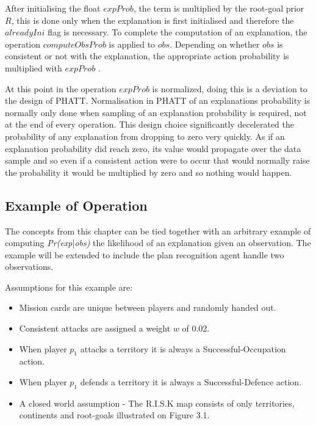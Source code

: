 \documentclass[parskip]{cs4rep}
\begin{document}
After initialising the float $expProb$, the term is multiplied by the root-goal prior $R$, this is done only when the explanation is first initialised and therefore the $alreadyIni$ flag is necessary. To complete the computation of an explanation, the operation $computeObsProb$ is applied to $obs$. Depending on whether $obs$ is consistent or not with the explanation, the appropriate action probability is multiplied with $expProb$ .

At this point in the operation $expProb$ is normalized, doing this is a deviation to the design of PHATT. Normalisation in PHATT of an explanations probability is normally only done when sampling of an explanation probability is required, not at the end of every operation. This design choice significantly decelerated the probability of any explanation from dropping to zero very quickly. As if an explanation probability did reach zero, its value would propagate over the data sample and so even if a consistent action were to occur that would normally raise the probability it would be multiplied by zero and so nothing would happen. 

\subsection{Example of Operation}

The concepts from this chapter can be tied together with an arbitrary example of computing \textit{Pr(exp}|\textit{obs)} the likelihood of an explanation given an observation. The example will be extended to include the plan recognition agent handle two observations.

Assumptions for this example are:

\begin{itemize}
\item
Mission cards are unique between players and randomly handed out.
\item
Consistent attacks are assigned a weight $w$ of 0.02.
\item
When player $p_1$ attacks a territory it is always a Successful-Occupation action.
\item
When player $p_1$ defends a territory it is always a Successful-Defence action.
\item
A closed world assumption - The R.I.S.K map consists of only territories, continents and root-goals illustrated on Figure 3.1.
\end{itemize}
\end{document}
